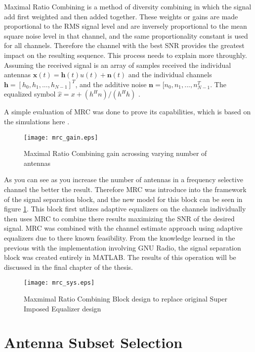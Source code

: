Maximal Ratio Combining is a method of diversity combining in which the signal add first weighted and then added together.  These weights or gains are made proportional to the RMS signal level and are inversely proportional to the mean square noise level in that channel, and the same proportionality constant is used for all channels\cite{fs1037c}.  Therefore the channel with the best SNR provides the greatest impact on the resulting sequence.  This process needs to explain more throughly.  Assuming the received signal is an array of samples received the individual antennas \(\boldsymbol{x}(t)=\boldsymbol{h}(t)u(t)+\boldsymbol{n}(t)\) and the individual channels \(\boldsymbol{h}=[h_{0},h_{1},...,h_{N-1}]^{T}\), and the additive noise \(\boldsymbol{n}=[n_{0},n_{1},...,n_{N-1}^{T}\).  The equalized symbol \(\hat{x}=x+(h^{H}n)/(h^{H}h) \) \cite{diversity}.

A simple evaluation of MRC was done to prove its capabilities, which is based on the simulations here \cite{mrc_m}.

\begin{figure}[!ht] 
\centering
\texttt{[image: mrc\_gain.eps]}
\caption{Maximal Ratio Combining gain acrossing varying number of antennas}
\end{figure}

As you can see as you increase the number of antennas in a frequency selective channel the better the result.  Therefore MRC was introduce into the framework of the signal separation block, and the new model for this block can be seen in figure \ref{mrc_sys}.  This block first utlizes adaptive equalizers on the channels individually then uses MRC to combine there results maximizing the SNR of the desired signal.  MRC was combined with the channel estimate approach using adaptive equalizers due to there known feasibility.  From the knowledge learned in the previous with the implementation involving GNU Radio, the signal separation block was created entirely in MATLAB.  The results of this operation will be discussed in the final chapter of the thesis.\\

\begin{figure}[!ht]\label{mrc_sys}
\centering
\texttt{[image: mrc\_sys.eps]}
\caption{Maxmimal Ratio Combining Block design to replace original Super Imposed Equalizer design}
\end{figure}

\section{Antenna Subset Selection}

